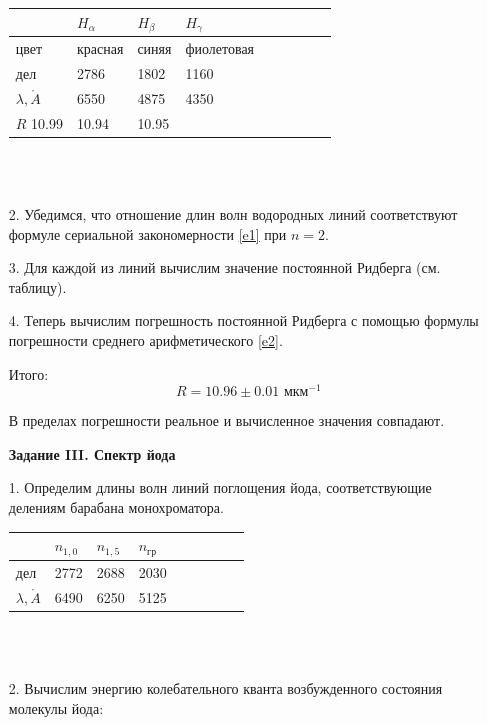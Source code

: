 \documentclass[12pt]{report}
\begin{document}
\begin{enumerate}
{
    \centering
    \begin{tabularx}{0.937\textwidth}{|X|X|X|X|X|X|X|X|X|}
        \hline
        & $H_\alpha$ & $H_\beta$ & $H_\gamma$ \\
        \hline
        цвет & красная & синяя & фиолетовая \\
        \hline
        дел & 2786 & 1802 & 1160 \\
        \hline
        $\lambda, \mathring{A}$ & 6550 & 4875 & 4350 \\
        \hline
        $R$ 10.99 & 10.94 & 10.95 \\
        \hline
    \end{tabularx}
}
\\
\\

\item[2.] Убедимся, что отношение длин волн водородных линий соответствуют формуле сериальной закономерности \eqref{e1} при $n = 2$.

\item[3.] Для каждой из линий вычислим значение постоянной Ридберга (см. таблицу).

\item[4.] Теперь вычислим погрешность постоянной Ридберга с помощью формулы погрешности среднего арифметического \eqref{e2}.

Итого:
$$R = 10.96 \pm 0.01 \text{ мкм}^{-1}$$

В пределах погрешности реальное и вычисленное значения совпадают.

\textbf{Задание III. Спектр йода}

\item[1.] Определим длины волн линий поглощения йода, соответствующие
делениям барабана монохроматора.

{
    \centering
    \begin{tabularx}{0.937\textwidth}{|X|X|X|X|X|X|X|X|X|}
        \hline
        & $n_{1,0}$ & $n_{1,5}$ & $n_\text{гр}$ \\
        \hline
        дел & 2772 & 2688 & 2030 \\
        \hline
        $\lambda, \mathring{A}$ & 6490 & 6250 & 5125 \\
        \hline
    \end{tabularx}
}
\\
\\

\item[2.] Вычислим энергию колебательного кванта возбужденного состояния
молекулы йода:


\end{enumerate}
\end{document}
